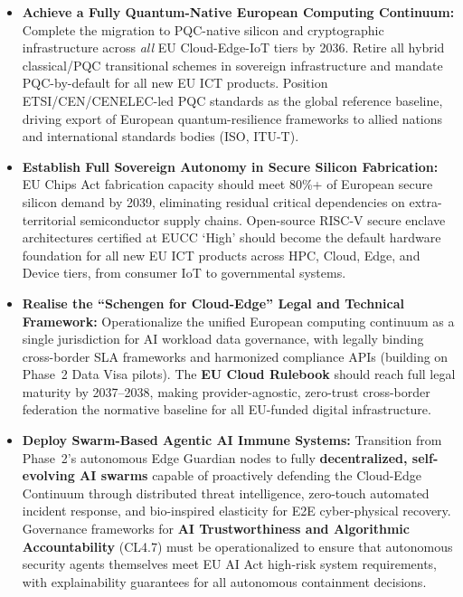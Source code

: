\documentclass{ieeeaccess}
\begin{document}
\begin{itemize}
    \item \textbf{Achieve a Fully Quantum-Native European Computing Continuum:}
    Complete the migration to PQC-native silicon and cryptographic infrastructure across
    \emph{all} EU Cloud-Edge-IoT tiers by 2036. Retire all hybrid classical/PQC
    transitional schemes in sovereign infrastructure and mandate PQC-by-default for all
    new EU ICT products. Position ETSI/CEN/CENELEC-led PQC standards as the global
    reference baseline, driving export of European quantum-resilience frameworks to allied
    nations and international standards bodies (ISO, ITU-T).

    \item \textbf{Establish Full Sovereign Autonomy in Secure Silicon Fabrication:}
    EU Chips Act fabrication capacity should meet 80\%+ of European secure silicon demand
    by 2039, eliminating residual critical dependencies on extra-territorial semiconductor
    supply chains. Open-source RISC-V secure enclave architectures certified at EUCC `High'
    should become the default hardware foundation for all new EU ICT products across
    HPC, Cloud, Edge, and Device tiers, from consumer IoT to governmental systems.

    \item \textbf{Realise the ``Schengen for Cloud-Edge'' Legal and Technical Framework:}
    Operationalize the unified European computing continuum as a single jurisdiction for
    AI workload data governance, with legally binding cross-border SLA frameworks and
    harmonized compliance APIs (building on Phase~2 Data Visa pilots). The
    \textbf{EU Cloud Rulebook} should reach full legal maturity by 2037--2038, making
    provider-agnostic, zero-trust cross-border federation the normative baseline for all
    EU-funded digital infrastructure.

    \item \textbf{Deploy Swarm-Based Agentic AI Immune Systems:}
    Transition from Phase~2's autonomous Edge Guardian nodes to fully \textbf{decentralized,
    self-evolving AI swarms} capable of proactively defending the Cloud-Edge Continuum
    through distributed threat intelligence, zero-touch automated incident response, and
    bio-inspired elasticity for E2E cyber-physical recovery. Governance frameworks for
    \textbf{AI Trustworthiness and Algorithmic Accountability} (CL4.7) must be operationalized
    to ensure that autonomous security agents themselves meet EU AI Act high-risk system
    requirements, with explainability guarantees for all autonomous containment decisions.


\end{itemize}
\end{document}
